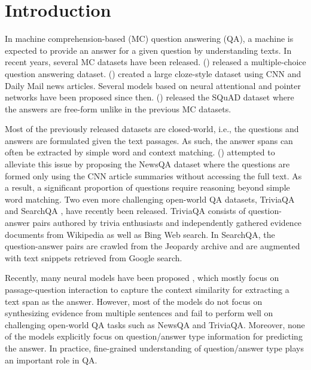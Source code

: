\documentclass[letterpaper]{article} %
\begin{document}
\section{Introduction}
\label{sec:intro}
In machine comprehension-based (MC) question answering (QA), a machine is expected to provide an answer for a given question by understanding texts.
In recent years, several MC datasets have been released.
\citeauthor{MCTestdata} (\citeyear{MCTestdata}) released a multiple-choice question answering dataset.
\citeauthor{HermannKGEKSB15} (\citeyear{HermannKGEKSB15}) created a large cloze-style dataset using CNN and Daily Mail news articles. Several models \cite{HermannKGEKSB15,chen2016thorough,KadlecSBK16,Kobayashi2016,attn_over_attn,GAR} based on neural attentional and pointer networks \cite{pointer_net} have been proposed since then.
\citeauthor{RajpurkarZLL16} (\citeyear{RajpurkarZLL16}) released the SQuAD dataset where the answers are free-form unlike in the previous MC datasets.

Most of the previously released datasets are closed-world, i.e., the questions and answers are formulated given the text passages. As such, the answer spans can often be extracted by simple word and context matching. \citeauthor{newsqa} (\citeyear{newsqa}) attempted to alleviate this issue by proposing the NewsQA dataset where the questions are formed only using the CNN article summaries without accessing the full text. As a result, a significant proportion of questions require reasoning beyond simple word matching.
Two even more challenging open-world QA datasets, TriviaQA \cite{triviaqa} and SearchQA \cite{searchqa}, have recently been released.
TriviaQA consists of question-answer pairs authored by trivia enthusiasts and independently gathered evidence documents from Wikipedia as well as Bing Web search.
In SearchQA, the question-answer pairs are crawled from the Jeopardy archive and are augmented with text snippets retrieved from Google search.

Recently, many neural models have been proposed \cite{mpcm_squad,memen,allenai_squad,smu_squad,fastqa_squad,salesforce_squad,cmu_squad}, which mostly focus on passage-question interaction to capture the context similarity for extracting a text span as the answer.
However, most of the models do not focus on synthesizing evidence from multiple sentences and fail to perform well on challenging open-world QA tasks such as NewsQA and TriviaQA.
Moreover, none of the models explicitly focus on question/answer type information for predicting the answer. In practice, fine-grained understanding of question/answer type plays an important role in QA.
\end{document}
